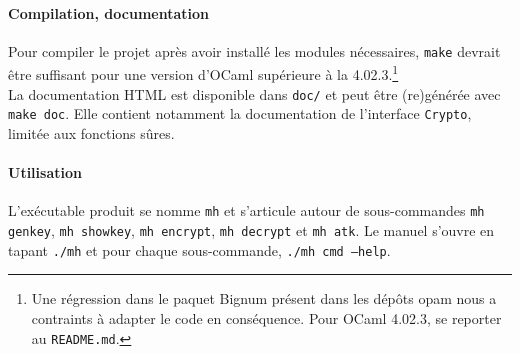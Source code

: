 \paragraph{Compilation, documentation} Pour compiler le projet après avoir installé les modules nécessaires, \texttt{make} devrait être suffisant pour une version d'OCaml supérieure à la 4.02.3.\footnote{Une régression dans le paquet Bignum présent dans les dépôts opam nous a contraints à adapter le code en conséquence. Pour OCaml 4.02.3, se reporter au \texttt{README.md}.}\\
La documentation HTML est disponible dans \texttt{doc/} et peut être (re)générée avec \texttt{make doc}. Elle contient notamment la documentation de l'interface \lstinline|Crypto|, limitée aux fonctions sûres.

\paragraph{Utilisation} L'exécutable produit se nomme \texttt{mh} et s'articule autour de sous-commandes \texttt{mh genkey}, \texttt{mh showkey}, \texttt{mh encrypt}, \texttt{mh decrypt} et \texttt{mh atk}. Le manuel s'ouvre en tapant \texttt{./mh} et pour chaque sous-commande, \texttt{./mh cmd ---help}.
